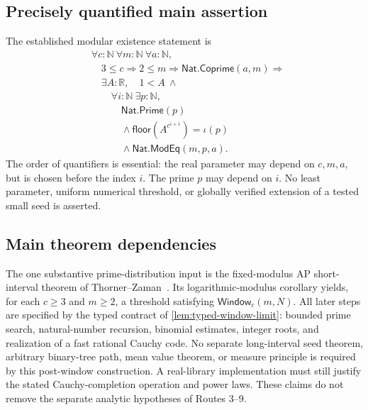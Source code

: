 \documentclass[11pt,reqno]{amsart}
\newcommand{\N}{\mathbb N}
\newcommand{\R}{\mathbb R}
\newcommand{\floor}{\textsf{floor}}
\theoremstyle{blueplain}
\newcounter{type}
\newcounter{asser}
\numberwithin{equation}{section}
\begin{document}
\subsection{Precisely quantified main assertion}
The established modular existence statement is
\[
\begin{aligned}
&\forall c:\N\ \forall m:\N\ \forall a:\N,\\
&\quad3\le c\Rightarrow2\le m\Rightarrow\textsf{Nat.Coprime}(a,m)\Rightarrow\\
&\quad\exists A:\R,\quad1<A\ \wedge\\
&\qquad\forall i:\N\ \exists p:\N,\\
&\qquad\quad\textsf{Nat.Prime}(p)\\
&\qquad\quad{}\wedge\floor(A^{c^{i+1}})=\iota(p)\\
&\qquad\quad{}\wedge\textsf{Nat.ModEq}(m,p,a).
\end{aligned}
\]
The order of quantifiers is essential: the real parameter may depend on
$c,m,a$, but is chosen before the index $i$. The prime $p$ may depend on
$i$. No least parameter, uniform numerical threshold, or globally verified
extension of a tested small seed is asserted.

\subsection{Main theorem dependencies}
The one substantive prime-distribution input is the fixed-modulus AP
short-interval theorem of Thorner--Zaman~\cite{ThornerZaman2024}.
Its logarithmic-modulus corollary yields, for each $c\ge3$ and $m\ge2$,
a threshold satisfying $\textsf{Window}_c(m,N)$.
All later steps are specified by the typed contract of
\cref{lem:typed-window-limit}: bounded prime search, natural-number
recursion, binomial estimates, integer roots, and realization of a fast
rational Cauchy code. No separate long-interval seed theorem, arbitrary
binary-tree path, mean value theorem, or measure principle is required
by this post-window construction. A real-library implementation must
still justify the stated Cauchy-completion operation and power laws.
These claims do not remove the separate analytic hypotheses of Routes 3--9.
\end{document}
